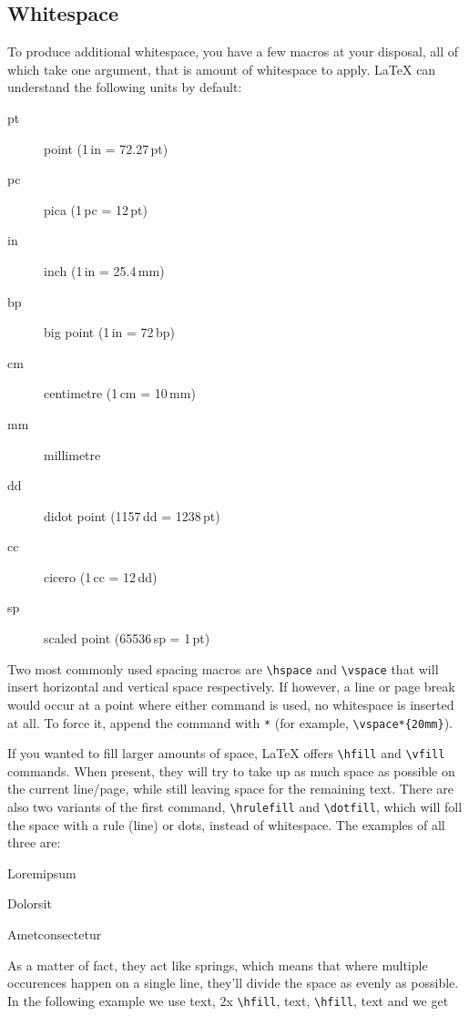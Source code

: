 \subsection{Whitespace}

To produce additional whitespace, you have a few macros at your disposal, all of which take one argument, that is amount of whitespace to apply. \LaTeX{} can understand the following units by default:

\begin{description}
  \item[pt]  point         (1\,in = 72.27\,pt)
  \item[pc]  pica          (1\,pc = 12\,pt)
  \item[in]  inch          (1\,in = 25.4\,mm)
  \item[bp]  big point     (1\,in = 72\,bp)
  \item[cm]  centimetre    (1\,cm = 10\,mm)
  \item[mm]  millimetre
  \item[dd]  didot point   (1157\,dd = 1238\,pt)
  \item[cc]  cicero        (1\,cc = 12\,dd)
  \item[sp]  scaled point  (65536\,sp = 1\,pt)
\end{description}

Two most commonly used spacing macros are \verb|\hspace| and \verb|\vspace| that will insert horizontal and vertical space respectively. If however, a line or page break would occur at a point where either command is used, no whitespace is inserted at all. To force it, append the command with \verb|*| (for example, \verb|\vspace*{20mm}|).

If you wanted to fill larger amounts of space, \LaTeX{} offers \verb|\hfill| and \verb|\vfill| commands. When present, they will try to take up as much space as possible on the current line/page, while still leaving space for the remaining text. There are also two variants of the first command, \verb|\hrulefill| and \verb|\dotfill|, which will foll the space with a rule (line) or dots, instead of whitespace. The examples of all three are:

Lorem\hfill ipsum

Dolor\hrulefill sit

Amet\dotfill consectetur

As a matter of fact, they act like springs, which means that where multiple occurences happen on a single line, they'll divide the space as evenly as possible. In the following example we use text, 2x \verb|\hfill|, text, \verb|\hfill|, text and we get

